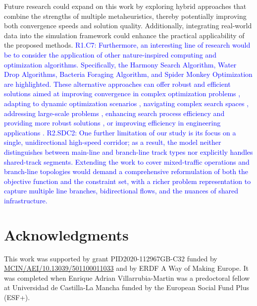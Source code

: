 \documentclass[Afour,sagev,times]{sagej}
\newcommand{\primero}[1]{\textcolor{blue}{#1}}
\newcommand{\segundo}[1]{\textcolor{blue}{#1}}
\begin{document}
Future research could expand on this work by exploring hybrid approaches that combine the strengths of multiple metaheuristics, thereby potentially improving both convergence speeds and solution quality. Additionally, integrating real-world data into the simulation framework could enhance the practical applicability of the proposed methods. \primero{R1.C7: Furthermore, an interesting line of research would be to consider the application of other nature-inspired computing and optimization algorithms. Specifically, the Harmony Search Algorithm, Water Drop Algorithms, Bacteria Foraging Algorithm, and Spider Monkey Optimization are highlighted. These alternative approaches can offer robust and efficient solutions aimed at improving convergence in complex optimization problems \cite{Siddique15}, adapting to dynamic optimization scenarios \cite{Siddique14a}, navigating complex search spaces \cite{Wang18}, addressing large-scale problems \cite{Akhand20}, enhancing search process efficiency and providing more robust solutions \cite{Siddique14b}, or improving efficiency in engineering applications \cite{Siddique16}.} \segundo{R2.SDC2: One further limitation of our study is its focus on a single, unidirectional high-speed corridor; as a result, the model neither distinguishes between main-line and branch-line track types nor explicitly handles shared-track segments. Extending the work to cover mixed-traffic operations and branch-line topologies would demand a comprehensive reformulation of both the objective function and the constraint set, with a richer problem representation to capture multiple line branches, bidirectional flows, and the nuances of shared infrastructure.}


\section*{Acknowledgments}
This work was supported by grant PID2020-112967GB-C32 funded by \url{MCIN/AEI/10.13039/501100011033} and by ERDF A Way of Making Europe. It was completed when Enrique Adrian Villarrubia-Martin was a predoctoral fellow at Universidad de Castilla-La Mancha funded by the European Social Fund Plus (ESF+).


\end{document}
